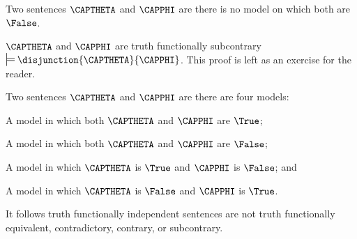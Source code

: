 \begin{majorILnc}{}
Two sentences $\CAPTHETA$ and $\CAPPHI$ are  \Iff there is no model on which both are $\False$. 
\end{majorILnc}

\begin{THEOREM}{}
	$\CAPTHETA$ and $\CAPPHI$ are truth functionally subcontrary \Iff $\sdtstile{}{}\disjunction{\CAPTHETA}{\CAPPHI}$. This proof is left as an exercise for the reader.
\end{THEOREM}

\begin{majorILnc}{}
Two sentences $\CAPTHETA$ and $\CAPPHI$ are  \Iff there are four models:
\begin{cenumerate}
\item A model in which both $\CAPTHETA$ and $\CAPPHI$ are $\True$; 
\item A model in which both $\CAPTHETA$ and $\CAPPHI$ are $\False$;
\item A model in which $\CAPTHETA$ is $\True$ and $\CAPPHI$ is $\False$; and
\item A model in which $\CAPTHETA$ is $\False$ and $\CAPPHI$ is $\True$.
\end{cenumerate}
\end{majorILnc}

\noindent{}It follows truth functionally independent sentences are not truth functionally equivalent, contradictory, contrary, or subcontrary.

